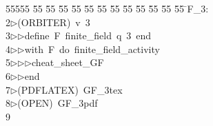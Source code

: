 %
%
\begin{tabbing}
55555 \= 55 \= 55 \= 55 \= 55 \= 55 \= 55 \= 55 \= 55 \= 55 \= 55 \= 55 \= 55 \= \>F\_3:\\[0pt]
2\>$\triangleright$\>(ORBITER)\ v\ 3\ \\[0pt]
3\>$\triangleright$\>$\triangleright$\>define\ F\ finite\_field\ q\ 3\ end\ \\[0pt]
4\>$\triangleright$\>$\triangleright$\>with\ F\ do\ finite\_field\_activity\ \\[0pt]
5\>$\triangleright$\>$\triangleright$\>$\triangleright$\>cheat\_sheet\_GF\ \\[0pt]
6\>$\triangleright$\>$\triangleright$\>end\\[0pt]
7\>$\triangleright$\>(PDFLATEX)\ GF\_3tex\\[0pt]
8\>$\triangleright$\>(OPEN)\ GF\_3pdf\\[0pt]
9\>\end{tabbing}
